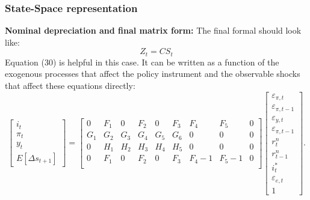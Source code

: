 \documentclass{beamer}
\begin{document}
\begin{frame} 
\frametitle{State-Space representation} 
\textbf{Nominal depreciation and final matrix form:} The final formal should look like:
\begin{equation}
Z_t = C S_t
\end{equation}
Equation (30) is helpful in this case. It can be written as a function
of the exogenous processes that affect the policy instrument and the
observable shocks that affect these equations directly:
{\tiny
\begin{equation}
\begin{bmatrix}
i_t \\
\pi_t \\
y_t \\
E[\Delta s_{t+1}]
\end{bmatrix}
=
\begin{bmatrix}
0 & F_1 & 0 & F_2 & 0 & F_3 & F_4 & F_5 & 0 \\
G_1 & G_2 & G_3 & G_4 & G_5 & G_6 & 0 & 0 & 0 \\
0 & H_1 & H_2 & H_3 & H_4 & H_5 & 0 & 0 & 0 \\
0 & F_1 & 0 & F_2 & 0 & F_3 & F_4-1 & F_5-1 & 0 \\
\end{bmatrix}
\begin{bmatrix}
\varepsilon_{\pi,t} \\
\varepsilon_{\pi,t-1} \\
\varepsilon_{y,t} \\
\varepsilon_{\pi,t-1} \\
r_t^n \\
r_{t-1}^n \\
i_t^* \\
\varepsilon_{e,t} \\
1 
\end{bmatrix}.
\end{equation}
}
\end{frame}
\end{document}

